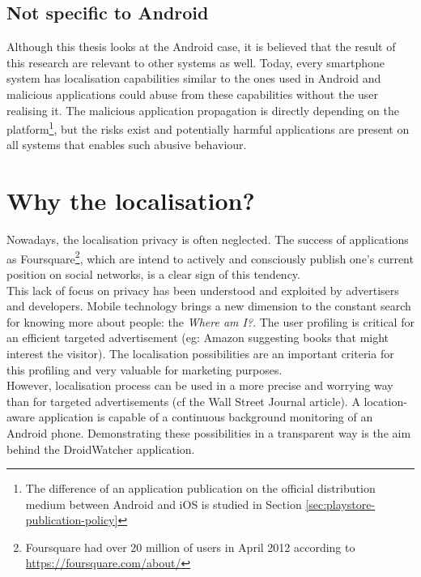 \subsection*{Not specific to Android}
Although this thesis looks at the Android case, it is believed that the result of this research are relevant to other systems as well.
Today, every smartphone system has localisation capabilities similar to the ones used in Android and malicious applications could abuse from these capabilities without the user realising it.
The malicious application propagation is directly depending on the platform\footnote{The difference of an application publication on the official distribution medium between Android and iOS is studied in Section \ref{sec:playstore-publication-policy}}, but the risks exist and potentially harmful applications are present on all systems that enables such abusive behaviour.

\section*{Why the localisation?}
\label{sec:why-localisation}

Nowadays, the localisation privacy is often neglected.
The success of applications as Foursquare\footnote{Foursquare had over 20 million of users in April 2012 according to \url{https://foursquare.com/about/}}, which are intend to actively and consciously publish one's current position on social networks, is a clear sign of this tendency.\\

This lack of focus on privacy has been understood and exploited by advertisers and developers.
Mobile technology brings a new dimension to the constant search for knowing more about people: the \emph{Where am I?}.
The user profiling is critical for an efficient targeted advertisement (eg: Amazon suggesting books that might interest the visitor).
The localisation possibilities are an important criteria for this profiling and very valuable for marketing purposes.\\

However, localisation process can be used in a more precise and worrying way than for targeted advertisements (cf the Wall Street Journal article).
A location-aware application is capable of a continuous background monitoring of an Android phone.
Demonstrating these possibilities in a transparent way is the aim behind the DroidWatcher application.\\

